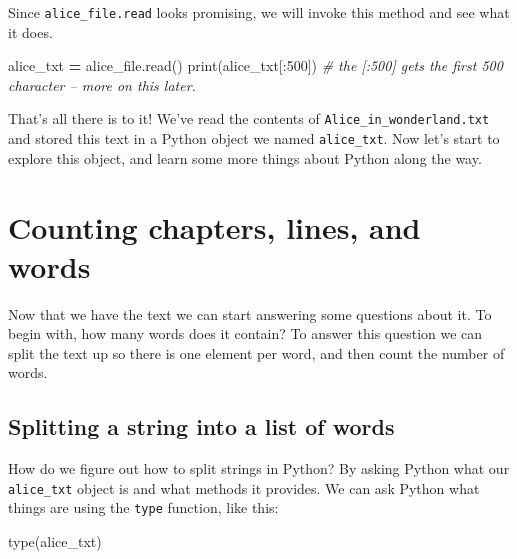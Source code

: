 \documentclass[]{book}
\newenvironment{Shaded}{\begin{snugshade}}{\end{snugshade}}
\newcommand{\DecValTok}[1]{\textcolor[rgb]{0.00,0.00,0.81}{#1}}
\newcommand{\CommentTok}[1]{\textcolor[rgb]{0.56,0.35,0.01}{\textit{#1}}}
\newcommand{\OperatorTok}[1]{\textcolor[rgb]{0.81,0.36,0.00}{\textbf{#1}}}
\newcommand{\BuiltInTok}[1]{#1}
\newcommand{\NormalTok}[1]{#1}
\begin{document}
Since \texttt{alice\_file.read} looks promising, we will invoke this
method and see what it does.

\begin{Shaded}
\begin{Highlighting}[]
\NormalTok{alice_txt }\OperatorTok{=}\NormalTok{ alice_file.read()}
\BuiltInTok{print}\NormalTok{(alice_txt[:}\DecValTok{500}\NormalTok{]) }\CommentTok{# the [:500] gets the first 500 character -- more on this later.}
\end{Highlighting}
\end{Shaded}

That's all there is to it! We've read the contents of
\texttt{Alice\_in\_wonderland.txt} and stored this text in a Python
object we named \texttt{alice\_txt}. Now let's start to explore this
object, and learn some more things about Python along the way.

\section{Counting chapters, lines, and
words}\label{counting-chapters-lines-and-words}

Now that we have the text we can start answering some questions about
it. To begin with, how many words does it contain? To answer this
question we can split the text up so there is one element per word, and
then count the number of words.

\subsection{Splitting a string into a list of
words}\label{splitting-a-string-into-a-list-of-words}

How do we figure out how to split strings in Python? By asking Python
what our \texttt{alice\_txt} object is and what methods it provides. We
can ask Python what things are using the \texttt{type} function, like
this:

\begin{Shaded}
\begin{Highlighting}[]
\BuiltInTok{type}\NormalTok{(alice_txt)}
\end{Highlighting}
\end{Shaded}
\end{document}
